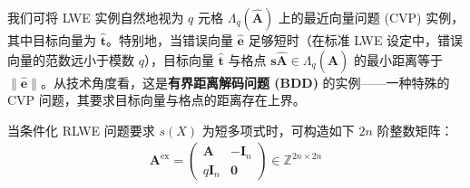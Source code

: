 \documentclass[12pt,a4paper]{article}
\numberwithin{equation}{section}
\begin{document}


我们可将 LWE 实例自然地视为 $q$ 元格 $\Lambda_q(\mathbf{\hat{A}})$ 上的最近向量问题 (CVP) 实例，其中目标向量为 $\mathbf{\hat{t}}$。特别地，当错误向量 $\mathbf{\hat{e}}$ 足够短时（在标准 LWE 设定中，错误向量的范数远小于模数 $q$），目标向量 $\mathbf{\hat{t}}$ 与格点 $\mathbf{s}\mathbf{\hat{A}} \in \Lambda_q(\mathbf{\hat{A}})$ 的最小距离等于 $\|\mathbf{\hat{e}}\|$。从技术角度看，这是\textbf{有界距离解码问题 (BDD)} 的实例——一种特殊的 CVP 问题，其要求目标向量与格点的距离存在上界。

当条件化 RLWE 问题要求 $s(X)$ 为短多项式时，可构造如下 $2n$ 阶整数矩阵：
\begin{align}
    \mathbf{A}^{\mathrm{ex}} = 
    \begin{pmatrix}
        \mathbf{A}    &  -\mathbf{I}_n \\
        q\mathbf{I}_n &  \mathbf{0}    
    \end{pmatrix} \in \mathbb{Z}^{2n \times 2n}
\end{align}
\end{document}
